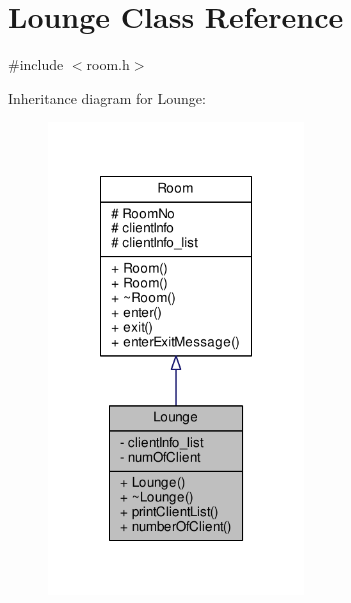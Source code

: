 \hypertarget{class_lounge}{}\section{Lounge Class Reference}
\label{class_lounge}


{\ttfamily \#include $<$room.\+h$>$}



Inheritance diagram for Lounge\+:
\nopagebreak
\begin{figure}[H]
\begin{center}
\leavevmode
\includegraphics[width=192pt]{class_lounge__inherit__graph}
\end{center}
\end{figure}


